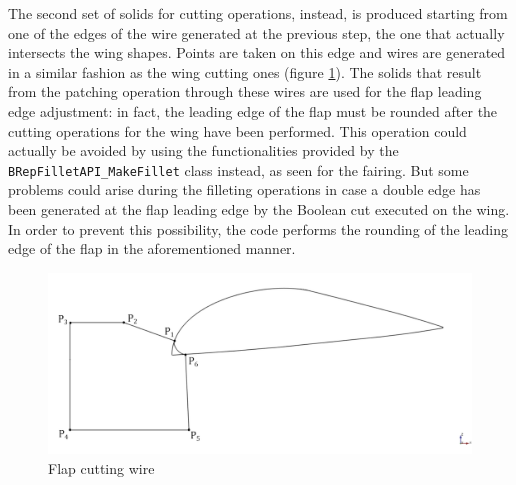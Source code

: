 \bigskip
\noindent
The second set of solids for cutting operations, instead, is produced starting from one of the edges of the wire generated at the previous step, the one that actually intersects the wing shapes. Points are taken on this edge and wires are generated in a similar fashion as the wing cutting ones (figure \ref{fig:FlapCuttingWires}). The solids that result from the patching operation through these wires are used for the flap leading edge adjustment: in fact, the leading edge of the flap must be rounded after the cutting operations for the wing have been performed. This operation could actually be avoided by using the functionalities provided by the \lstinline[language=Java]!BRepFilletAPI_MakeFillet! class instead, as seen for the fairing. But some problems could arise during the filleting operations in case a double edge has been generated at the flap leading edge by the Boolean cut executed on the wing. In order to prevent this possibility, the code performs the rounding of the leading edge of the flap in the aforementioned manner.
%
\begin{figure}[H]
\centering
\includegraphics[scale=0.40]{Immagini/Appendice/Flap/flap_08}
\caption{Flap cutting wire}
\label{fig:FlapCuttingWires}
\end{figure}
%  

